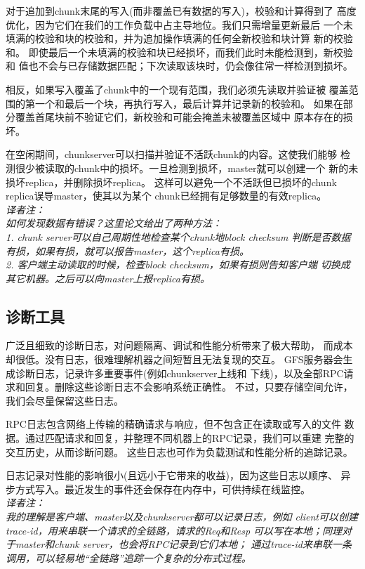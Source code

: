 对于追加到chunk末尾的写入(而非覆盖已有数据的写入)，校验和计算得到了
高度优化，因为它们在我们的工作负载中占主导地位。我们只需增量更新最后
一个未填满的校验和块的校验和，并为追加操作填满的任何全新校验和块计算
新的校验和。
即使最后一个未填满的校验和块已经损坏，而我们此时未能检测到，新校验和
值也不会与已存储数据匹配；下次读取该块时，仍会像往常一样检测到损坏。

相反，如果写入覆盖了chunk中的一个现有范围，我们必须先读取并验证被
覆盖范围的第一个和最后一个块，再执行写入，最后计算并记录新的校验和。
如果在部分覆盖首尾块前不验证它们，新校验和可能会掩盖未被覆盖区域中
原本存在的损坏。

在空闲期间，chunkserver可以扫描并验证不活跃chunk的内容。这使我们能够
检测很少被读取的chunk中的损坏。一旦检测到损坏，master就可以创建一个
新的未损坏replica，并删除损坏replica。
这样可以避免一个不活跃但已损坏的chunk replica误导master，使其以为某个
chunk已经拥有足够数量的有效replica。
\\\emph{译者注：
\\如何发现数据有错误？这里论文给出了两种方法：
\\1. chunk server可以自己周期性地检查某个chunk地block checksum
判断是否数据有损，如果有损，就可以报告master，这个replica有损。
\\2. 客户端主动读取的时候，检查block checksum，如果有损则告知客户端
切换成其它机器。之后可以向master上报replica有损。
}

\subsection{诊断工具}

广泛且细致的诊断日志，对问题隔离、调试和性能分析带来了极大帮助，
而成本却很低。没有日志，很难理解机器之间短暂且无法复现的交互。
GFS服务器会生成诊断日志，记录许多重要事件(例如chunkserver上线和
下线)，以及全部RPC请求和回复。删除这些诊断日志不会影响系统正确性。
不过，只要存储空间允许，我们会尽量保留这些日志。

RPC日志包含网络上传输的精确请求与响应，但不包含正在读取或写入的文件
数据。通过匹配请求和回复，并整理不同机器上的RPC记录，我们可以重建
完整的交互历史，从而诊断问题。
这些日志也可作为负载测试和性能分析的追踪记录。

日志记录对性能的影响很小(且远小于它带来的收益)，因为这些日志以顺序、
异步方式写入。最近发生的事件还会保存在内存中，可供持续在线监控。
\\\emph{译者注：
\\我的理解是客户端、master以及chunkserver都可以记录日志，例如
client可以创建trace-id，用来串联一个请求的全链路，请求的Req和Resp
可以写在本地；同理对于master和chunk server，也会将RPC记录到它们本地；
通过trace-id来串联一条调用，可以轻易地“全链路”追踪一个复杂的分布式过程。
}